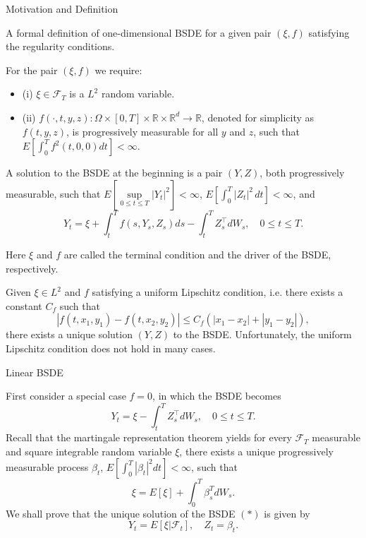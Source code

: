 \documentclass{beamer}
\begin{document}
\begin{frame}{Motivation and Definition}

    {\footnotesize \footnotesize

\par A formal definition of one-dimensional BSDE 
for a given pair \((\xi,f)\) satisfying the regularity conditions.
\par For the pair \((\xi,f)\) we require: 
\begin{itemize}
    \item  (i) \(\xi\in\mathcal{F}_{T}\) is a \(L^{2}\) random variable.
    \item (ii) \(f(\cdot,t,y,z):\Omega\times[0,T]\times\mathbb{R}\times\mathbb{R}^{d}\to \mathbb{R}\), denoted for simplicity as \(f(t,y,z)\), is progressively 
measurable for all \(y\) and \(z\), such that \(E[\int_{0}^{T}f^{2}(t,0,0)dt]<\infty\).
\end{itemize}
\par  \pause A solution to the BSDE at the beginning is a pair \((Y,Z)\), 
both progressively measurable, such that \(E[\sup\limits_{0\leq t\leq T}|Y_{t}|^{2}]<\infty\),
 \(E\left[\int_{0}^{T}|Z_{t}|^{2}\,dt\right]<\infty\), and
 \vspace{-1em}
\[
Y_{t}=\xi+\int_{t}^{T}f(s,Y_{s},Z_{s})ds-\int_{t}^{T}Z_{s}^{\top}dW_{s},\quad 0 \leq t \leq T.
\]
\par Here \(\xi\) and \(f\) are called the terminal condition and the driver of the BSDE, respectively.
\par  \pause Given \(\xi \in L^2\) and \(f\) satisfying a uniform Lipschitz condition, i.e. there exists a constant \(C_f\) such that  
\[
|f(t,x_1,y_1) - f(t,x_2,y_2)| \leq C_f \left( |x_1 - x_2| + |y_1 - y_2| \right),
\]  
there exists a unique solution \((Y,Z)\) to the BSDE. Unfortunately, the uniform Lipschitz 
condition does not hold in many cases.
    }
    
\end{frame}

\begin{frame}{Linear BSDE}

    {\footnotesize \footnotesize
    First consider a special case \(f = 0\), in which the BSDE becomes  
    \[
    Y_t = \xi - \int_{t}^{T} Z_s^{\top} dW_s, \quad 0 \leq t \leq T. \tag{*}
    \]
     \pause Recall that the martingale representation theorem yields 
    for every \(\mathcal{F}_T\) measurable and square integrable 
    random variable \(\xi\), there exists a unique progressively measurable 
    process \(\beta_t\), \(E\left[\int_0^T |\beta_t|^2 dt\right] < \infty\), such that
\[
\xi = E[\xi] + \int_0^T \beta_s^T dW_s.
\]
 \pause We shall prove that the unique solution of the BSDE $(*)$ is given by
\[
Y_t = E[\xi|\mathcal{F}_t], \quad Z_t = \beta_t.
\]
    }
    
\end{frame}
\end{document}
